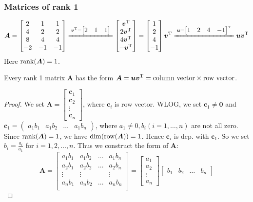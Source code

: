 \subsubsection{Matrices of rank 1}
\begin{example}\[
\bm A = \begin{bmatrix}
2&1&1\\4&2&2\\8&4&4\\-2&-1&-1
\end{bmatrix}\xlongequal{\bm v\trans = \begin{bmatrix}
2&1&1
\end{bmatrix}}\begin{bmatrix}
\bm v\trans\\2\bm v\trans\\4\bm v\trans\\-\bm v\trans
\end{bmatrix} = \begin{bmatrix}
1\\2\\4\\-1
\end{bmatrix}\bm v\trans\xlongequal{\bm u=\begin{bmatrix}
1&2&4&-1
\end{bmatrix}\trans}\bm u\bm v\trans
\]
Here $\operatorname{rank}(\bm A) = 1$.
\end{example}
\begin{proposition}
Every rank 1 matrix $\bm A$ has the form $\bm A = \bm u\bm v^{\mathrm T} = \text{column vector}\times\text{row vector}$.
\end{proposition}
\newpage
\begin{proof}
We set $\bm A = \begin{bmatrix}
\bm c_1\\\bm c_2\\\vdots\\\bm c_n
\end{bmatrix}$, where $\bm c_i$ is row vector.
WLOG, we set $\bm c_1\ne\bm 0$ and $\bm c_1 = \begin{pmatrix}
a_1b_1&a_1b_2&\dots&a_1b_n
\end{pmatrix}$, where $a_1\ne0,b_i(i=1,\dots,n)$ are not all zero.\\
Since $\operatorname{rank}(\bm A) = 1$, we have $\dim(\operatorname{row}(\bm A)) = 1$. Hence $\bm c_i$ is dep. with $\bm c_1$. So we set $b_i = \frac{a_i}{a_1}$ for $i=1,2,\dots,n$. Thus we construct the form of $\bm A$:
\[
\bm A = \begin{bmatrix}
a_1b_1&a_1b_2&\dots&a_1b_n\\
a_2b_1&a_2b_2&\dots&a_2b_n\\
\vdots&\vdots&&\vdots\\
a_nb_1&a_nb_2&\dots&a_nb_n\\
\end{bmatrix} = \begin{bmatrix}
a_1\\a_2\\\vdots\\a_n
\end{bmatrix}\begin{bmatrix}
b_1&b_2&\dots&b_n
\end{bmatrix}
\]
\end{proof}

